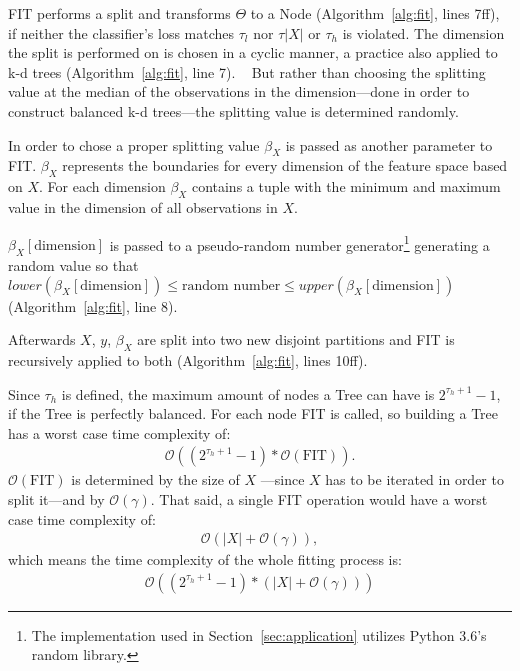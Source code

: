 FIT performs a split and transforms $\Theta$ to a Node
(Algorithm~\ref{alg:fit}, lines 7ff), if neither the
classifier's loss matches $\tau_l$ nor $\tau{|X|}$ or
$\tau_h$ is violated. The dimension the split is performed
on is chosen in a cyclic manner, a practice also applied to
k-d trees (Algorithm~\ref{alg:fit}, line 7).%
~\cite{Brown2015kdtree}
But rather than choosing the splitting value at the median
of the observations in the dimension---done in order to
construct balanced k-d trees---the splitting value
is determined randomly.\cite{Brown2015kdtree}

In order to chose a proper splitting value $\beta_X$ is
passed as another parameter to FIT. $\beta_X$ represents
the boundaries for every dimension of the feature space
based on $X$. For each dimension $\beta_X$ contains a
tuple with the minimum and maximum value in the dimension
of all observations in $X$.

$\beta_X[\text{dimension}]$ is passed to a pseudo-random
number generator\footnote{The implementation used in
  Section~\ref{sec:application} utilizes Python 3.6's
  random library.\cite[chapter 9.6]{python}}
generating a random value so that
$lower(\beta_X[\text{dimension}]) \leq \text{random number}
\leq upper(\beta_X[\text{dimension}])$
(Algorithm~\ref{alg:fit}, line 8).

Afterwards $X$, $y$, $\beta_X$ are split into two new
disjoint partitions and FIT is recursively applied to both
(Algorithm~\ref{alg:fit}, lines 10ff).

Since $\tau_h$ is defined, the maximum amount of nodes a
Tree can have is $2^{\tau_h + 1} - 1$, if the Tree is
perfectly balanced.\cite[chapter 16.1]{Teschl} For each
node FIT is called, so building a Tree has a worst case
time complexity of:
\begin{align}
  \mathcal{O}((2^{\tau_h + 1} -1)*\mathcal{O}(\text{FIT})).
\end{align}
$\mathcal{O}(\text{FIT})$ is determined by the size of $X$%
---since $X$ has to be iterated in order to split it---and
by $\mathcal{O}(\gamma)$. That said, a single FIT
operation would have a worst case time complexity of:
\begin{align}
  \mathcal{O}(|X| + \mathcal{O}(\gamma)),
\end{align} which means the time complexity of the whole
fitting process is:
\begin{align}
  \mathcal{O}((2^{\tau_h + 1} - 1) *
  (|X| + \mathcal{O}(\gamma)))
\label{eq:O_fit}
\end{align}

